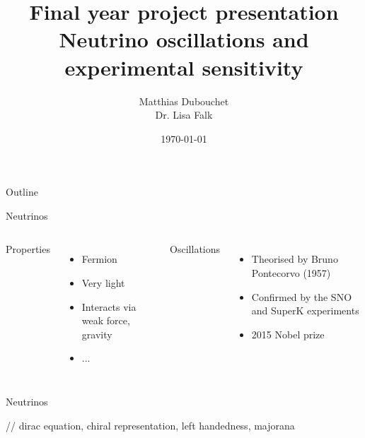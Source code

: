 \documentclass{beamer}
\title{Final year project presentation\\Neutrino
oscillations and \\experimental sensitivity}
\author{Matthias Dubouchet\\Dr. Lisa Falk}
\date{\today}
\begin{document}
\maketitle


\begin{frame}{Outline}

\end{frame}


\begin{frame}{Neutrinos}

\begin{columns}

Properties
		\begin{itemize}
		\item Fermion
		\item Very light
		\item Interacts via weak force, gravity
		\item ...
		\end{itemize}
Oscillations
		\begin{itemize}
			\item Theorised by Bruno Pontecorvo (1957)
				\item Confirmed by the SNO and SuperK experiments
				\item 2015 Nobel prize
		\end{itemize}
\end{columns}
\end{frame}


\begin{frame}{Neutrinos}

// dirac equation, chiral representation, left handedness, majorana

\end{frame}
\end{document}
